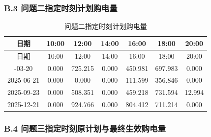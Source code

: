 \documentclass[zihao=-4,a4paper,UTF8,fontset=none]{ctexart}
\begin{document}
\endgroup

\par\pagebreak[2]\subsubsection*{B.3 问题二指定时刻计划购电量}

\begingroup\renewcommand{\tablename}{附表}\renewcommand{\thetable}{B-3}

\begin{longtable}[]{@{}ccccccc@{}}
\caption{问题二指定时刻计划购电量}\label{tab:appendix-B-3}\tabularnewline
\toprule\noalign{}
日期 & 10:00 & 12:00 & 14:00 & 16:00 & 18:00 & 20:00 \\
\midrule\noalign{}
\endfirsthead
\toprule\noalign{}
日期 & 10:00 & 12:00 & 14:00 & 16:00 & 18:00 & 20:00 \\
\midrule\noalign{}
\endhead
\bottomrule\noalign{}
\endlastfoot
2025-03-20 & 0.000 & 725.215 & 0.000 & 450.981 & 697.983 & 0.000 \\
2025-06-21 & 0.000 & 0.000 & 0.000 & 111.599 & 356.846 & 0.000 \\
2025-09-23 & 0.000 & 508.351 & 0.000 & 459.218 & 731.594 & 12.994 \\
2025-12-21 & 0.000 & 924.766 & 0.000 & 804.412 & 711.214 & 0.000 \\
\end{longtable}

\endgroup

\par\pagebreak[2]\subsubsection*{B.4 问题三指定时刻原计划与最终生效购电量}

\begingroup\renewcommand{\tablename}{附表}\renewcommand{\thetable}{B-4}
\end{document}
